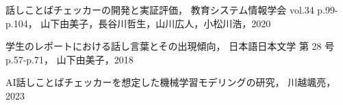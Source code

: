 \clearpage
{} %
\renewcommand{\bibname}{参考文献} %
\begin{thebibliography}{99999}
話しことばチェッカーの開発と実証評価， 教育システム情報学会 vol.34 p.99-p.104， 山下由美子，長谷川哲生，山川広人，小松川浩，2020

学生のレポートにおける話し言葉とその出現傾向， 日本語日本文学 第 28 号 p.57-p.71， 
山下由美子，2018

AI話しことばチェッカーを想定した機械学習モデリングの研究， 川越颯亮， 2023

\end{thebibliography}
